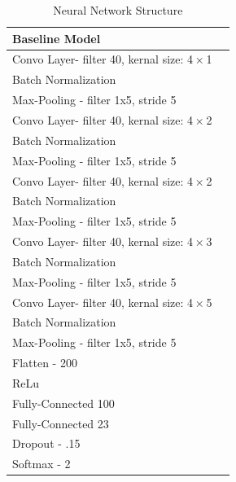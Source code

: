 \documentclass[10pt,twocolumn,letterpaper]{article}
\begin{document}
\begin{table}[]
	\begin{tabular}{|l|l|}
		\hline
		\textbf{Baseline Model}                   \\ \hline
		Convo Layer- filter 40, kernal size: 4 × 1               \\ \hline
		Batch Normalization                                    \\ \hline
		Max-Pooling - filter 1x5, stride 5                     \\ \hline
		Convo Layer- filter 40, kernal size: 4 × 2                 \\ \hline
		Batch Normalization                                       \\ \hline
		Max-Pooling - filter 1x5, stride 5                    \\ \hline
		Convo Layer- filter 40, kernal size: 4 × 2                 \\ \hline
		Batch Normalization                                       \\ \hline
		Max-Pooling - filter 1x5, stride 5                        \\ \hline
		Convo Layer- filter 40, kernal size: 4 × 3                 \\ \hline
		Batch Normalization                                        \\ \hline
		Max-Pooling - filter 1x5, stride 5                      \\ \hline
		Convo Layer- filter 40, kernal size: 4 × 5                \\ \hline
		Batch Normalization                                         \\ \hline
		Max-Pooling - filter 1x5, stride 5                          \\ \hline
		Flatten - 200                                              \\ \hline
		ReLu                                                    \\ \hline
		Fully-Connected 100                                       \\ \hline
		Fully-Connected 23                                        \\ \hline
		Dropout -  .15                                          \\ \hline
		Softmax - 2                                       \\ \hline
		
	\end{tabular}
	\caption{\label{tab: Model Arch} Neural Network Structure}
\end{table}
\end{document}
